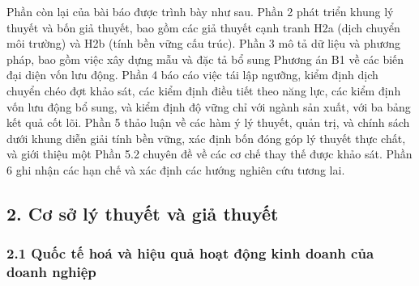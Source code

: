\documentclass[12pt,a4paper]{article}
\begin{document}
Phần còn lại của bài báo được trình bày như sau. Phần 2 phát triển khung
lý thuyết và bốn giả thuyết, bao gồm các giả thuyết cạnh tranh H2a (dịch
chuyển môi trường) và H2b (tính bền vững cấu trúc). Phần 3 mô tả dữ liệu
và phương pháp, bao gồm việc xây dựng mẫu và đặc tả bổ sung Phương án B1
về các biến đại diện vốn lưu động. Phần 4 báo cáo việc tái lập ngưỡng,
kiểm định dịch chuyển chéo đợt khảo sát, các kiểm định điều tiết theo
năng lực, các kiểm định vốn lưu động bổ sung, và kiểm định độ vững chỉ
với ngành sản xuất, với ba bảng kết quả cốt lõi. Phần 5 thảo luận về các
hàm ý lý thuyết, quản trị, và chính sách dưới khung diễn giải tính bền
vững, xác định bốn đóng góp lý thuyết thực chất, và giới thiệu một Phần
5.2 chuyên đề về các cơ chế thay thế được khảo sát. Phần 6 ghi nhận các
hạn chế và xác định các hướng nghiên cứu tương lai.

\hypertarget{2-cux1a1-sux1edf-luxfd-thuyux1ebft-vuxe0-giux1ea3-thuyux1ebft}{%
\subsection{2. Cơ sở lý thuyết và giả
thuyết}\label{2-cux1a1-sux1edf-luxfd-thuyux1ebft-vuxe0-giux1ea3-thuyux1ebft}}

\hypertarget{21-quux1ed1c-tux1ebf-houxe1-vuxe0-hiux1ec7u-quux1ea3-houx1ea1t-ux111ux1ed9ng-kinh-doanh-cux1ee7a-doanh-nghiux1ec7p}{%
\subsubsection{2.1 Quốc tế hoá và hiệu quả hoạt động kinh doanh của
doanh
nghiệp}\label{21-quux1ed1c-tux1ebf-houxe1-vuxe0-hiux1ec7u-quux1ea3-houx1ea1t-ux111ux1ed9ng-kinh-doanh-cux1ee7a-doanh-nghiux1ec7p}}
\end{document}
